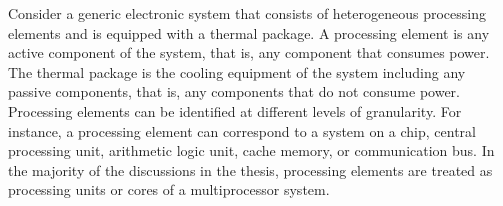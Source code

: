 Consider a generic electronic system that consists of \np heterogeneous
processing elements and is equipped with a thermal package. A processing element
is any active component of the system, that is, any component that consumes
power. The thermal package is the cooling equipment of the system including any
passive components, that is, any components that do not consume power.
Processing elements can be identified at different levels of granularity. For
instance, a processing element can correspond to a system on a chip, central
processing unit, arithmetic logic unit, cache memory, or communication bus. In
the majority of the discussions in the thesis, processing elements are treated
as processing units or cores of a multiprocessor system.

